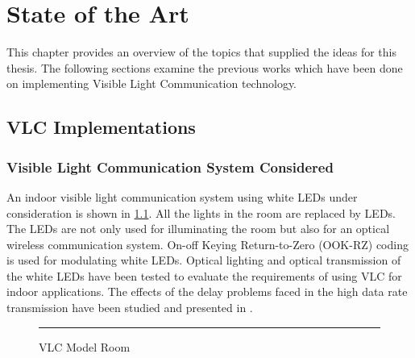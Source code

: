 
\chapter{State of the Art} %

\label{SoA} %


This chapter provides an overview of the topics that supplied the ideas for this thesis. The
following sections examine the previous works which have been done on implementing
Visible Light Communication technology.


\section{VLC Implementations}

\subsection{Visible Light Communication System Considered}

An indoor visible light communication system using white LEDs under consideration is
shown in \ref{fig:vlc-model}. All the lights in the room are replaced by LEDs. The LEDs
are not only used for illuminating the room but also for an optical wireless
communication system. On-off Keying Return-to-Zero (OOK-RZ) coding is used for
modulating white LEDs. Optical lighting and optical transmission of the white LEDs
have been tested to evaluate the requirements of using VLC for indoor applications. The
effects of the delay problems faced in the high data rate transmission have been studied
and presented in .

\begin{figure}[htbp]
  \centering
    \rule{35em}{0.5pt}
  \caption[VLC Model Room]{VLC Model Room}
  \label{fig:vlc-model}
\end{figure}

